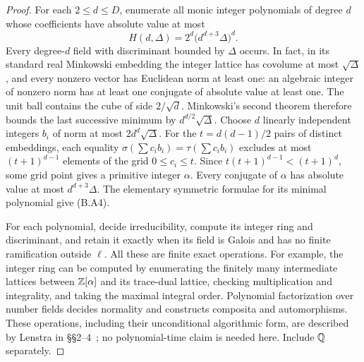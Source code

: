 \begin{proof}
For each \(2\le d\le D\), enumerate all monic integer
polynomials of degree \(d\) whose coefficients have absolute value
at most
\[
 H(d,\Delta)=2^d\bigl(d^{d+3}\Delta\bigr)^d.
\tag{B.A4}
\]
Every degree-\(d\) field with discriminant bounded by \(\Delta\)
occurs.  In fact, in its standard real Minkowski embedding the
integer lattice has covolume at most \(\sqrt\Delta\), and every
nonzero vector has Euclidean norm at least one: an algebraic integer
of nonzero norm has at least one conjugate of absolute value at
least one.  The unit ball contains the cube of side \(2/\sqrt d\).
Minkowski's second theorem therefore bounds the last successive
minimum by \(d^{d/2}\sqrt\Delta\).  Choose \(d\) linearly
independent integers \(b_i\) of norm at most
\(2d^d\sqrt\Delta\).  For the \(t=d(d-1)/2\) pairs of
distinct embeddings, each equality
\(\sigma(\sum c_i b_i)=\tau(\sum c_i b_i)\) excludes at most
\((t+1)^{d-1}\) elements of the grid
\(0\le c_i\le t\).  Since
\(t(t+1)^{d-1}<(t+1)^d\), some grid point gives a primitive
integer \(\alpha\).  Every conjugate of \(\alpha\) has absolute
value at most \(d^{d+3}\Delta\).  The elementary symmetric
formulae for its minimal polynomial give (B.A4).

For each polynomial, decide irreducibility, compute its integer ring
and discriminant, and retain it exactly when its field is Galois
and has no finite ramification outside \(\ell\).  All these are
finite exact operations.  For example, the integer ring can be
computed by enumerating the finitely many intermediate lattices
between \(\mathbb Z[\alpha]\) and its trace-dual lattice, checking
multiplication and integrality, and taking the maximal integral
order.  Polynomial factorization over number fields decides normality
and constructs composita and automorphisms.  These operations,
including their unconditional algorithmic form, are described by
Lenstra in \S\S2--4~\cite{Lenstra1992Algorithms}; no polynomial-time
claim is needed here.  Include \(\mathbb Q\) separately.


\end{proof}
